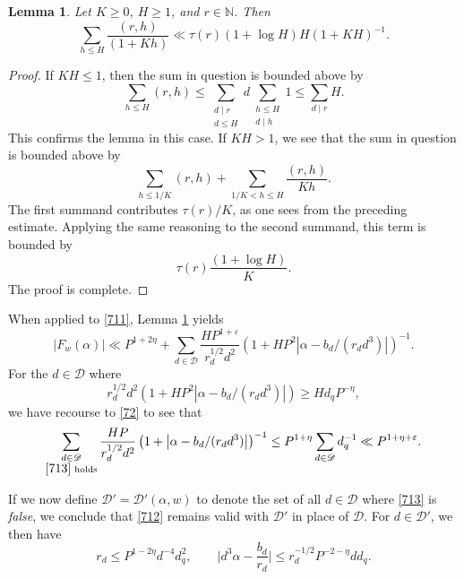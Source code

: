 \documentclass[reqno]{amsart}
\newcommand\eps{\varepsilon}
\newtheorem{lemma}[thm]{Lemma}
\numberwithin{equation}{section}
\begin{document}
\begin{lemma}\label{L72}
Let $K \geq 0$, $H \geq 1$, and $r \in \mathbb{N}$. Then
$$
\sum_{h \leq H} \frac{(r,h)}{(1 + Kh)} \ll \tau(r) (1 + \log H) H (1 + KH)^{-1}.
$$
\end{lemma}

\begin{proof}
If $KH \leq 1$, then the sum in question is bounded above by
$$\sum_{h \leq H} (r,h) \leq \sum_{\substack{d \mid r\\ d\leq H}} d \sum_{\substack{h \leq H\\d\mid h}} 1 \leq \sum_{d \mid r} H.$$
This confirms the lemma in this case. If $KH > 1$, we  see that the sum in question is bounded above by
$$\sum_{h \leq 1/K} (r,h) + \sum_{1/K < h \leq H} \frac{(r,h)}{Kh}.$$
The first summand contributes $\tau(r)/K$, as one sees from the preceding estimate. Applying the same reasoning to the second summand, this term is bounded by
$$\tau(r) \frac{(1 + \log H)}{K}.$$
The proof is complete.
\end{proof}

When applied to \eqref{711}, Lemma \ref{L72} yields
\begin{equation}\label{712}|F_w(\alpha)| \ll P^{1 + 2\eta} + \sum_{d \in \mathscr{D}} \frac{HP^{1+\eps}}{r_d^{1/2}d^{2}} \left(1+HP^2\left|\alpha - b_d/(r_dd^3)\right|\right)^{-1}.\end{equation}
For the $d \in \mathscr{D}$ where
\begin{equation}\label{713}{r_d^{1/2} d^{2}}{(1 + HP^2 |\alpha - b_d/(r_d d^3)|)} \geq H d_q P^{-\eta},\end{equation}
we have recourse to \eqref{72} to see that
$$\sum_{\substack{d \in \mathscr{D}\\\eqref{713} \text{ holds}  }} \frac{HP}{r_d^{1/2} d^{2}} \left(1 +\left|\alpha-b_d/(r_d d^3)\right|\right)^{-1} \leq P^{1 + \eta} \sum_{d \in \mathscr{D}} d_q^{-1} \ll P^{1 +\eta+ \eps}.$$

If we now define $\mathscr{D}' = \mathscr{D}'(\alpha, w)$ to denote the set of all $d \in \mathscr{D}$ where \eqref{713} is \emph{false}, we conclude that \eqref{712} remains valid with $\mathscr{D}'$ in place of $\mathscr{D}$. For $d \in \mathscr{D}'$, we then have
\begin{equation}\label{714}r_d \leq P^{1 - 2\eta} d^{-4} d_q^2,\qquad
\Big|d^3 \alpha - \frac{b_d}{r_d}\Big| \leq r_d^{-1/2} P^{-2 -\eta} dd_q.\end{equation}
\end{document}
